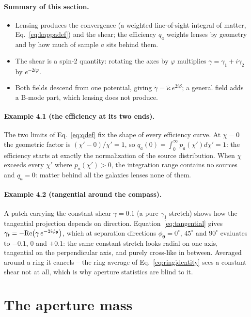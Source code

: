 \documentclass[11pt]{article}
\newcommand{\btheta}{\boldsymbol{\theta}}
\numberwithin{equation}{section}
\begin{document}
\paragraph{Summary of this section.}
\begin{itemize}
  \item Lensing produces the convergence (a weighted line-of-sight
    integral of matter, Eq.~\eqref{eq:kappadef}) and the shear; the
    efficiency $q_a$ weights lenses by geometry and by how much of
    sample $a$ sits behind them.
  \item The shear is a spin-2 quantity: rotating the axes by
    $\varphi$ multiplies $\gamma = \gamma_1 + i\gamma_2$ by
    $e^{-2i\varphi}$.
  \item Both fields descend from one potential, giving
    $\tilde\gamma = \tilde\kappa\, e^{2i\beta}$; a general field adds
    a B-mode part, which lensing does not produce.
\end{itemize}

\paragraph{Example 4.1 (the efficiency at its two ends).}
The two limits of Eq.~\eqref{eq:qdef} fix the shape of every
efficiency curve.  At $\chi = 0$ the geometric factor is
$(\chi' - 0)/\chi' = 1$, so $q_a(0) = \int_0^\infty p_a(\chi')
d\chi' = 1$: the efficiency starts at exactly the normalization of
the source distribution.  When $\chi$ exceeds every $\chi'$ where
$p_a(\chi') > 0$, the integration range contains no sources and
$q_a = 0$: matter behind all the galaxies lenses none of them.

\paragraph{Example 4.2 (tangential around the compass).}
A patch carrying the constant shear $\gamma = 0.1$ (a pure
$\gamma_1$ stretch) shows how the tangential projection depends on
direction.  Equation~\eqref{eq:tangential} gives
$\gamma_t = -{\rm Re}\bigl(\gamma\, e^{-2i\phi_{\btheta}}\bigr)$,
which at separation directions $\phi_{\btheta} = 0^\circ$,
$45^\circ$ and $90^\circ$ evaluates to $-0.1$, $0$ and $+0.1$: the
same constant stretch looks radial on one axis, tangential on the
perpendicular axis, and purely cross-like in between.  Averaged
around a ring it cancels -- the ring average of
Eq.~\eqref{eq:ringidentity} sees a constant shear not at all, which
is why aperture statistics are blind to it.
\section{The aperture mass}
\label{sec:aperture}
\end{document}

